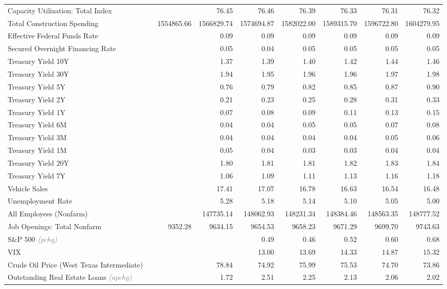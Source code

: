 \documentclass[11pt, letterpaper]{article}\usepackage[]{graphicx}\usepackage[]{color}
\begin{document}
\begin{table}[H]
\begin{tabular}{lrrrrrrrr}
  Capacity Utilization: Total Index &  &  & 76.45 & 76.46 & 76.39 & 76.33 & 76.31 & 76.32 \\ 
  Total Construction Spending &  & 1554865.66 & 1566829.74 & 1574694.87 & 1582022.00 & 1589315.70 & 1596722.80 & 1604279.95 \\ 
  Effective Federal Funds Rate &  &  & 0.09 & 0.09 & 0.09 & 0.09 & 0.09 & 0.09 \\ 
  Secured Overnight Financing Rate &  &  & 0.05 & 0.04 & 0.05 & 0.05 & 0.05 & 0.05 \\ 
  Treasury Yield 10Y &  &  & 1.37 & 1.39 & 1.40 & 1.42 & 1.44 & 1.46 \\ 
  Treasury Yield 30Y &  &  & 1.94 & 1.95 & 1.96 & 1.96 & 1.97 & 1.98 \\ 
  Treasury Yield 5Y &  &  & 0.76 & 0.79 & 0.82 & 0.85 & 0.87 & 0.90 \\ 
  Treasury Yield 2Y &  &  & 0.21 & 0.23 & 0.25 & 0.28 & 0.31 & 0.33 \\ 
  Treasury Yield 1Y &  &  & 0.07 & 0.08 & 0.09 & 0.11 & 0.13 & 0.15 \\ 
  Treasury Yield 6M &  &  & 0.04 & 0.04 & 0.05 & 0.05 & 0.07 & 0.08 \\ 
  Treasury Yield 3M &  &  & 0.04 & 0.04 & 0.04 & 0.04 & 0.05 & 0.06 \\ 
  Treasury Yield 1M &  &  & 0.05 & 0.04 & 0.03 & 0.03 & 0.04 & 0.04 \\ 
  Treasury Yield 20Y &  &  & 1.80 & 1.81 & 1.81 & 1.82 & 1.83 & 1.84 \\ 
  Treasury Yield 7Y &  &  & 1.06 & 1.09 & 1.11 & 1.13 & 1.16 & 1.18 \\ 
  Vehicle Sales &  &  & 17.41 & 17.07 & 16.78 & 16.63 & 16.54 & 16.48 \\ 
  Unemployment Rate &  &  & 5.28 & 5.18 & 5.14 & 5.10 & 5.05 & 5.00 \\ 
  All Employees (Nonfarm) &  &  & 147735.14 & 148062.93 & 148231.34 & 148384.46 & 148563.35 & 148777.52 \\ 
  Job Openings: Total Nonfarm &  & 9352.28 & 9634.15 & 9654.53 & 9658.23 & 9671.29 & 9699.70 & 9743.63 \\ 
  S\&P 500 \textit{\footnotesize\textcolor{gray}{(pchg)}} &  &  &  & 0.49 & 0.46 & 0.52 & 0.60 & 0.68 \\ 
  VIX &  &  &  & 13.00 & 13.69 & 14.33 & 14.87 & 15.32 \\ 
  Crude Oil Price (West Texas Intermediate) &  &  & 78.84 & 74.92 & 75.99 & 75.53 & 74.70 & 73.86 \\ 
  Outstanding Real Estate Loans \textit{\footnotesize\textcolor{gray}{(apchg)}} &  &  & 1.72 & 2.51 & 2.25 & 2.13 & 2.06 & 2.02 \\ 

\end{tabular}
\end{table}
\end{document}
